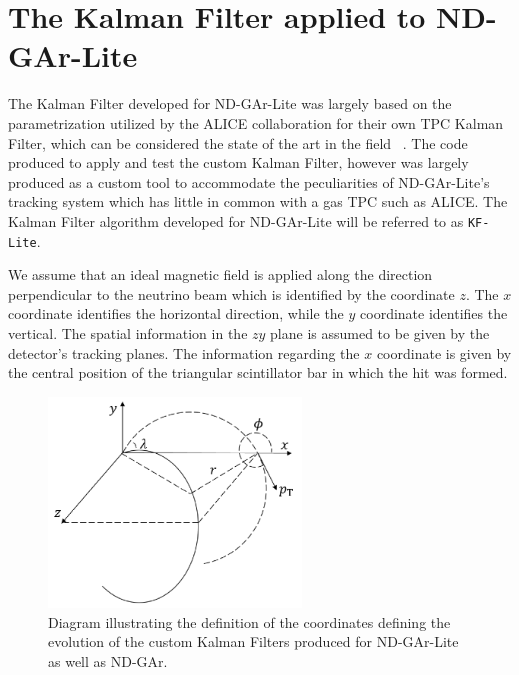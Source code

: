 \section{The Kalman Filter applied to ND-GAr-Lite}
\label{Sec:KFLite}
The Kalman Filter developed for ND-GAr-Lite was largely based on the parametrization utilized by the ALICE collaboration for their own TPC Kalman Filter, which can be considered the state of the art in the field ~\cite{Ivanov:2003yr, Arslandok:2022dyb}. The code produced to apply and test the custom Kalman Filter, however was largely produced as a custom tool to accommodate the peculiarities of ND-GAr-Lite's tracking system which has little in common with a gas TPC such as ALICE. The Kalman Filter algorithm developed for ND-GAr-Lite will be referred to as \texttt{KF-Lite}. 

We assume that an ideal magnetic field is applied along the direction perpendicular to the neutrino beam which is identified by the coordinate $z$. The $x$ coordinate identifies the horizontal direction, while the $y$ coordinate identifies the vertical.  The spatial information in the $zy$ plane is assumed to be given by the detector's tracking planes. The information regarding the $x$ coordinate is given by the central position of the triangular scintillator bar in which the hit was formed.

\begin{figure}[!ht]
         \centering
         \includegraphics[width=0.6\textwidth]{figures/ch4-KF_NDGArLite/Variables_Diagram_new.png}
        \caption[Diagram illustrating the definition of the coordinates defining the evolution of the custom Kalman Filter.]{Diagram illustrating the definition of the coordinates defining the evolution of the custom Kalman Filters produced for ND-GAr-Lite as well as ND-GAr. } \label{fig:Detector_var}
\end{figure}


